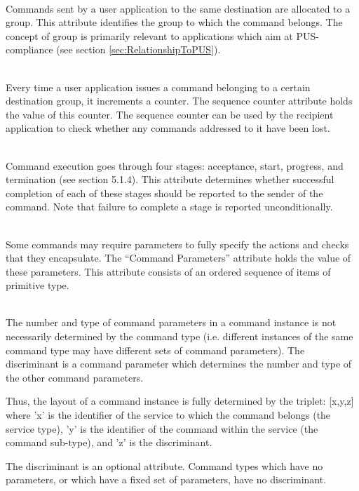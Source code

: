 \begin{fw_description}
\item[Group]\hfill\\
Commands sent by a user application to the same destination are allocated to a group. This attribute identifies the group to which the command belongs. The concept of group is primarily relevant to applications which aim at PUS-compliance (see section \ref{sec:RelationshipToPUS}). 

\item[Sequence Counter]\hfill\\
Every time a user application issues a command belonging to a certain destination group, it increments a counter. The sequence counter attribute holds the value of this counter. The sequence counter can be used by the recipient application to check whether any commands addressed to it have been lost. 

\item[Acknowledge Level]\hfill\\
Command execution goes through four stages: acceptance, start, progress, and termination (see section 5.1.4). This attribute determines whether successful completion of each of these stages should be reported to the sender of the command. Note that failure to complete a stage is reported unconditionally.

\item[Command Parameters]\hfill\\
Some commands may require parameters to fully specify the actions and checks that they encapsulate. The “Command Parameters” attribute holds the value of these parameters. This attribute consists of an ordered sequence of items of primitive type. 

\item[Discriminant]\hfill\\
The number and type of command parameters in a command instance is not necessarily determined by the command type (i.e. different instances of the same command type may have different sets of command parameters). The discriminant is a command parameter which determines the number and type of the other command parameters. 

Thus, the layout of a command instance is fully determined by the triplet: [x,y,z] where 'x' is the identifier of the service to which the command belongs (the service type), 'y' is the identifier of the command within the service (the command sub-type), and 'z' is the discriminant. 

The discriminant is an optional attribute. Command types which have no parameters, or which have a fixed set of parameters, have no discriminant.
\end{fw_description}


